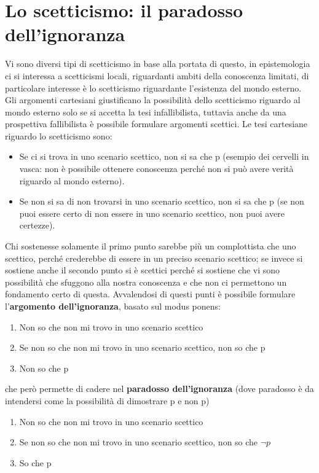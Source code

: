\documentclass[10pt,a4paper]{article}
\begin{document}
\section{Lo scetticismo: il paradosso dell'ignoranza}
Vi sono diversi tipi di scetticismo in base alla portata di questo, in epistemologia ci si interessa a scetticismi locali, riguardanti ambiti della conoscenza limitati, di particolare interesse è lo scetticismo riguardante l'esistenza del mondo esterno. Gli argomenti cartesiani giustificano la possibilità dello scetticismo riguardo al mondo esterno solo se si accetta la tesi infallibilista, tuttavia anche da una prospettiva fallibilista è possibile formulare argomenti scettici. Le tesi cartesiane riguardo lo scetticismo sono:
\begin{itemize}
	\item Se ci si trova in uno scenario scettico, non si sa che p (esempio dei cervelli in vasca: non è possibile ottenere conoscenza perché non si può avere verità riguardo al mondo esterno).
	\item Se non si sa di non trovarsi in uno scenario scettico, non si sa che p (se non puoi essere certo di non essere in uno scenario scettico, non puoi avere certezze).
\end{itemize}
Chi sostenesse solamente il primo punto sarebbe più un complottista che uno scettico, perché crederebbe di essere in un preciso scenario scettico; se invece si sostiene anche il secondo punto si è scettici perché si sostiene che vi sono possibilità che sfuggono alla nostra conoscenza e che non ci permettono un fondamento certo di questa. Avvalendosi di questi punti è possibile formulare l'\textbf{argomento dell'ignoranza}, basato sul modus ponens:
\begin{enumerate}
	\item Non so che non mi trovo in uno scenario scettico
	\item Se non so che non mi trovo in uno scenario scettico, non so che p
	\item Non so che p
\end{enumerate}
che però permette di cadere nel \textbf{paradosso dell'ignoranza} (dove paradosso è da intendersi come la possibilità di dimostrare p e non p)
\begin{enumerate}
	\item Non so che non mi trovo in uno scenario scettico
	\item Se non so che non mi trovo in uno scenario scettico, non so che \(\neg p\)
	\item So che p
\end{enumerate}
\end{document}
